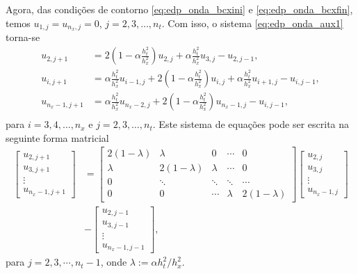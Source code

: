 Agora, das condições de contorno \eqref{eq:edp_onda_bcxini} e \eqref{eq:edp_onda_bcxfin}, temos $u_{1,j}=u_{n_x,j}=0$, $j=2, 3, \dotsc, n_t$. Com isso, o sistema \eqref{eq:edp_onda_aux1} torna-se
\begin{align}
  u_{2,j+1} &= 2\left(1-\alpha\frac{h_t^2}{h_x^2}\right)u_{2,j} + \alpha\frac{h_t^2}{h_x^2}u_{3,j} - u_{2,j-1},\\
  u_{i,j+1} &= \alpha\frac{h_t^2}{h_x^2}u_{i-1,j} + 2\left(1-\alpha\frac{h_t^2}{h_x^2}\right)u_{i,j} + \alpha\frac{h_t^2}{h_x^2}u_{i+1,j} - u_{i,j-1},\\
  u_{n_x-1,j+1} &= \alpha\frac{h_t^2}{h_x^2}u_{n_x-2,j} + 2\left(1-\alpha\frac{h_t^2}{h_x^2}\right)u_{n_x-1,j} - u_{i,j-1},\\
\end{align}
para $i=3, 4, \dotsc, n_x$ e $j=2, 3, \dotsc, n_t$. Este sistema de equações pode ser escrita na seguinte forma matricial
\begin{align}
  \begin{bmatrix}
    u_{2,j+1}\\
    u_{3,j+1}\\
    \vdots\\
    u_{n_x-1,j+1}
  \end{bmatrix}
  &=
  \begin{bmatrix}
    2(1-\lambda) & \lambda & 0 & \cdots & 0\\
    \lambda & 2(1-\lambda) & \lambda & \cdots & 0\\
    0  & \ddots & \ddots & \ddots & \cdots \\
    0  & 0 & \cdots & \lambda & 2(1-\lambda)
  \end{bmatrix}
  \begin{bmatrix}
    u_{2,j}\\
    u_{3,j}\\
    \vdots\\
    u_{n_x-1,j}
  \end{bmatrix}\nonumber\\
  &-
  \begin{bmatrix}
    u_{2,j-1}\\
    u_{3,j-1}\\
    \vdots\\
    u_{n_x-1,j-1}
  \end{bmatrix},\label{eq:edp_onda_iter3}
\end{align}
para $j=2, 3, \cdots, n_t-1$, onde $\lambda := \alpha h_t^2/h_x^2$.

